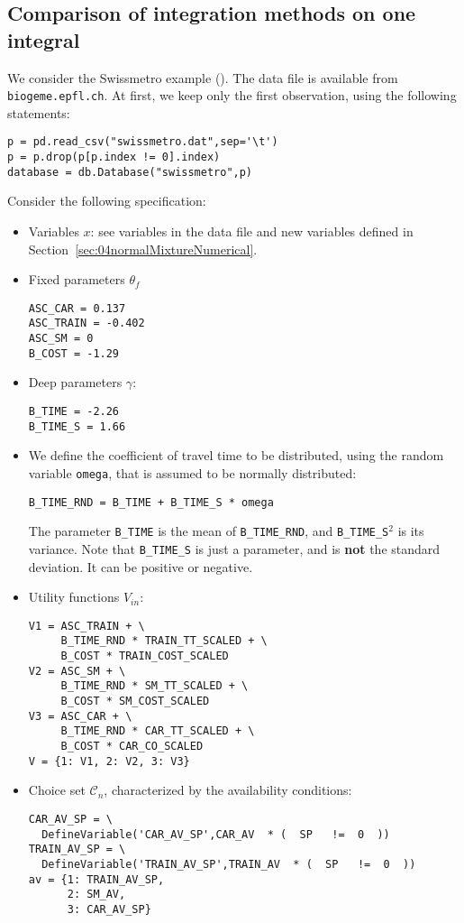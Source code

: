 \documentclass[12pt,a4paper]{article}
\newcommand{\C}{\mathcal{C}}
\begin{document}
\subsection{Comparison of integration methods on one integral}
We
consider the Swissmetro example (\cite{BierAxhaAbay01}). The data file
is available from \verb+biogeme.epfl.ch+. At first, we keep only the first
observation, using the following statements:
\begin{lstlisting}
p = pd.read_csv("swissmetro.dat",sep='\t')
p = p.drop(p[p.index != 0].index)
database = db.Database("swissmetro",p)
\end{lstlisting}
Consider the
following specification: 
\begin{itemize}
\item Variables $x$: see variables in the data file and new variables
  defined in Section~\ref{sec:04normalMixtureNumerical}. 
\item Fixed parameters $\theta_f$
\begin{lstlisting}
ASC_CAR = 0.137
ASC_TRAIN = -0.402
ASC_SM = 0
B_COST = -1.29
\end{lstlisting}
\item Deep parameters $\gamma$:
\begin{lstlisting}
B_TIME = -2.26
B_TIME_S = 1.66
\end{lstlisting}
\item We define the coefficient of travel time to be distributed,
  using the random variable \lstinline$omega$, that is assumed to be
  normally distributed:
\begin{lstlisting}
B_TIME_RND = B_TIME + B_TIME_S * omega
\end{lstlisting}
The parameter \lstinline$B_TIME$ is the mean of \lstinline$B_TIME_RND$, and
\lstinline$B_TIME_S$$^2$ is its variance. Note that
\lstinline$B_TIME_S$ is just a parameter, and is \textbf{not} the
standard deviation. It can
be positive or negative. 
\item Utility functions $V_{in}$:
\begin{lstlisting}
V1 = ASC_TRAIN + \
     B_TIME_RND * TRAIN_TT_SCALED + \
     B_COST * TRAIN_COST_SCALED
V2 = ASC_SM + \
     B_TIME_RND * SM_TT_SCALED + \
     B_COST * SM_COST_SCALED
V3 = ASC_CAR + \
     B_TIME_RND * CAR_TT_SCALED + \
     B_COST * CAR_CO_SCALED
V = {1: V1, 2: V2, 3: V3}
\end{lstlisting}
\item Choice set $\C_n$, characterized by the availability conditions:
\begin{lstlisting}
CAR_AV_SP = \
  DefineVariable('CAR_AV_SP',CAR_AV  * (  SP   !=  0  ))
TRAIN_AV_SP = \
  DefineVariable('TRAIN_AV_SP',TRAIN_AV  * (  SP   !=  0  ))
av = {1: TRAIN_AV_SP,
      2: SM_AV,
      3: CAR_AV_SP}
\end{lstlisting}
\end{itemize}
\end{document}
